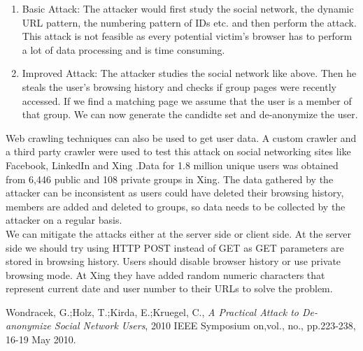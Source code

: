 \documentclass{article}
\begin{document}
\begin{enumerate}
\item Basic Attack: The attacker would first study the social network, the dynamic URL pattern, the numbering pattern of IDs etc. and then perform the attack. This attack is not feasible as every potential victim’s browser has to perform a lot of data processing and is time consuming.
\item  Improved Attack: The attacker studies the social network like above. Then he steals the user’s browsing history and checks if group pages were recently accessed. If we find a matching page we assume that the user is a member of that group. We can now generate the candidte set and de-anonymize the user.

\end{enumerate}

Web crawling techniques can also be used to get user data. A custom crawler and a third party crawler were used to test this attack on social networking sites like Facebook, LinkedIn and Xing .Data for 1.8 million unique users was obtained from 6,446 public and 108 private groups in Xing. The data gathered by the attacker can be inconsistent as users could have deleted their browsing history, members are added and deleted to groups, so data needs to be collected by the attacker on a regular basis.\\

We can mitigate the attacks either at the server side or client side. At the server side we should try using HTTP POST instead of GET as GET parameters are stored in browsing history. Users should disable browser history or use private browsing mode. At Xing they have added random numeric characters that represent current date and user number to their URLs to solve the problem.

\begin{thebibliography}{9}

  Wondracek, G.;Holz, T.;Kirda, E.;Kruegel, C.,
  \emph{A Practical Attack to De-anonymize Social Network Users},
  2010 IEEE Symposium on,vol., no., pp.223-238,
  16-19 May 2010.

\end{thebibliography}
\end{document}
